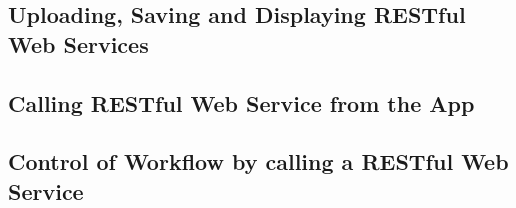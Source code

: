 
\subsection{Uploading, Saving and Displaying RESTful Web Services}
\label{subsec: UploadSaveDisplayWebServices}

\subsection{Calling RESTful Web Service from the App}
\label{subsec: CallingWebServices}

\subsection{Control of Workflow by calling a RESTful Web Service}
\label{subsec: WorkflowControlThroughWS}